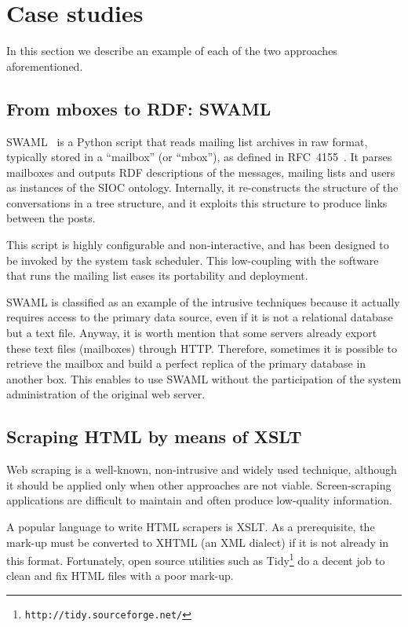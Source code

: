 \documentclass{../templates/www2008-submission}
\begin{document}
\section{Case studies}\label{sec:case-studies}

In this section we describe an example of each of the two approaches
aforementioned.

\subsection{From mboxes to RDF: SWAML}

SWAML~\cite{SWAML2007} is a Python script that reads mailing 
list archives in raw format, typically stored in a ``mailbox'' 
(or ``mbox''), as defined in RFC~4155~\cite{RFC4155}. It parses
mailboxes and outputs RDF descriptions of the messages, mailing lists
and users as instances of the SIOC ontology. Internally, it re-constructs
the structure of the conversations in a tree structure, and it exploits
this structure to produce links between the posts.

This script is highly configurable and non-interactive, and has been
designed to be invoked by the system task scheduler. This low-coupling with
the software that runs the mailing list eases its portability and
deployment.

SWAML is classified as an example of the intrusive techniques because
it actually requires access to the primary data source, even if
it is not a relational database but a text file. Anyway, it is
worth mention that some servers already export these text files
(mailboxes) through HTTP. Therefore, sometimes it is possible to
retrieve the mailbox and build a perfect replica of the primary
database in another box. This enables to use SWAML without the
participation of the system administration of the original
web server.

\subsection{Scraping HTML by means of XSLT}

Web scraping is a well-known, non-intrusive and widely used technique,
although it should be applied only when other approaches are not viable.
Screen-scraping applications are difficult to maintain and
often produce low-quality information.

A popular language to write HTML scrapers is XSLT. As a prerequisite,
the mark-up must be converted to XHTML (an XML dialect) if it is not
already in this format. Fortunately, open source utilities such as
Tidy\footnote{\texttt{http://tidy.sourceforge.net/}} do a decent job
to clean and fix HTML files with a poor mark-up.
\end{document}
